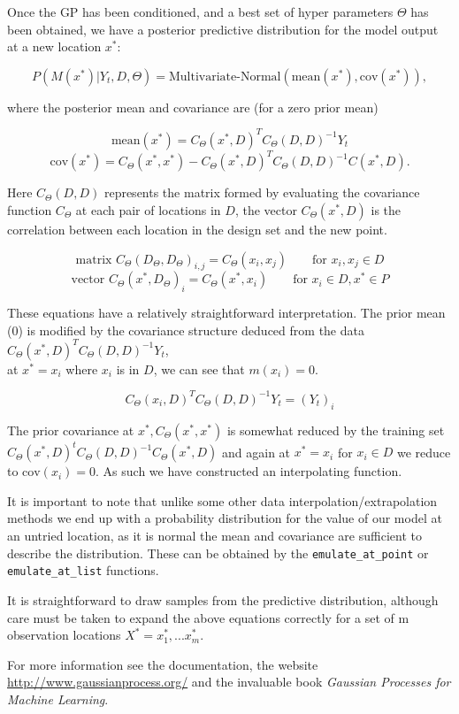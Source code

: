 \documentclass{article}
\begin{document}
Once the GP has been conditioned, and a best set of hyper parameters
$Θ$ has been obtained, we have a posterior predictive distribution
for the model output at a new location $x^*$:

\[P(M(x^*) | Y_t, D, Θ)
	= \textrm{Multivariate-Normal}(\textrm{mean}(x^*), \textrm{cov}(x^*)), \]

where the posterior mean and covariance are (for a zero prior mean)

\[ \textrm{mean}(x^*) = C_Θ(x^*,D)^T  C_Θ(D,D)^{-1} Y_t \]
\[ \textrm{cov}(x^*) = C_Θ(x^*,x^*) - C_Θ(x^*,D)^T C_Θ(D,D)^{-1} C(x^*,D). \]

Here $C_Θ(D,D)$ represents the matrix formed by evaluating the
covariance function $C_Θ$ at each pair of locations in $D$, the vector
$C_Θ(x^*,D)$ is the correlation between each location in the design
set and the new point.

\[ \textrm{matrix } C_Θ(D_Θ,D_Θ)_{i,j} = C_Θ(x_i,x_j)
	 \qquad \textrm{for } x_i,x_j ∈ D \]
\[ \textrm{vector } C_Θ(x^*,D_Θ)_{i} = C_Θ(x^*,x_i)
	 \qquad \textrm{for } x_i ∈ D, x^* ∈ P \]

These equations have a relatively straightforward interpretation. The
prior mean (0) is modified by the covariance structure deduced from
the data \\
$C_Θ(x^*,D)^T C_Θ(D,D)^{-1} Y_t$, \\
at $x^* = x_i$ where $x_i$ is in $D$,
we can see that $m(x_i) = 0$.

\[ C_Θ(x_i,D)^T C_Θ(D,D)^{-1} Y_t = (Y_t)_i \]

 The prior covariance at $x^*, C_Θ(x^*,x^*)$ is
somewhat reduced by the training set $C_Θ(x^*,D)^t C_Θ(D,D)^{-1}
C_Θ(x^*,D)$ and again at $x^*=x_i$ for $x_i∈D$ we reduce to $\textrm{cov}(x_i) =
0$. As such we have constructed an interpolating function.

It is important to note that unlike some other data
interpolation/extrapolation methods we end up with a probability
distribution for the value of our model at an untried location, as it
is normal the mean and covariance are sufficient to describe the
distribution. These can be obtained by the \texttt{emulate\_at\_point} or
\texttt{emulate\_at\_list} functions.

It is straightforward to draw samples from the predictive
distribution, although care must be taken to expand the above
equations correctly for a set of m observation locations
$X^* = {x^*_1, ... x^*_m}$.

For more information see the documentation, the website
\url{http://www.gaussianprocess.org/} and the invaluable book
\emph{Gaussian Processes for Machine Learning}.
\end{document}
